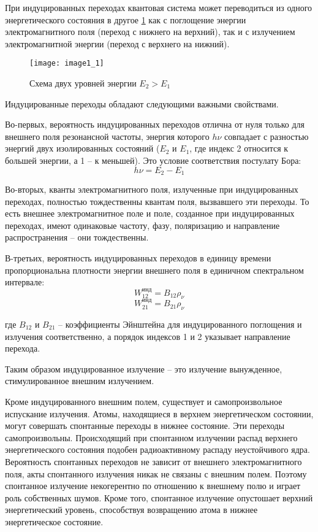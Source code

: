 
При индуцированных переходах квантовая система может переводиться из одного 
энергетического состояния в другое \ref{img1.1} как с поглощение энергии 
электромагнитного поля (переход с нижнего на верхний), так и с излучением 
электромагнитной энергии (переход с верхнего на нижний).

\begin{figure}[h!]
	\center
	\texttt{[image: image1\_1]} \\
	\caption{Схема двух уровней энергии \( E_2 > E_1 \)}
	\label{img1.1}
\end{figure}

Индуцированные переходы обладают следующими важными свойствами.

Во-первых, вероятность индуцированных переходов отлична от нуля только для 
внешнего поля резонансной частоты, энергия которого \( h\nu \) совпадает с 
разностью энергий двух изолированных состояний (\( E_2 \) и \( E_1 \), где 
индекс 2 относится к большей энергии, а 1 -- к меньшей). Это условие 
соответствия постулату Бора:
\[
	h\nu = E_2 - E_1
\]

Во-вторых, кванты электромагнитного поля, излученные при индуцированных 
переходах, полностью тождественны квантам поля, вызвавшего эти переходы. 
То есть внешнее электромагнитное поле и поле, созданное при индуцированных 
переходах, имеют одинаковые частоту, фазу, поляризацию и направление 
распространения -- они тождественны.

В-третьих, вероятность индуцированных переходов в единицу времени 
пропорциональна плотности энергии внешнего поля в единичном спектральном 
интервале:
\begin{equation}
	W_{12}^\text{инд} = B_{12}\rho_\nu
	\label{eq3.1.2}
\end{equation}
\begin{equation}
	W_{21}^\text{инд} = B_{21}\rho_\nu
	\label{eq3.1.3}
\end{equation}

где \( B_{12} \) и  \( B_{21} \) -- коэффициенты Эйнштейна для индуцированного 
поглощения и излучения соответственно, а порядок индексов 1 и 2 указывает 
направление перехода.

Таким образом индуцированное излучение -- это излучение вынужденное, 
стимулированное внешним излучением. 

Кроме индуцированного внешним полем, существует и самопроизвольное испускание 
излучения. Атомы, находящиеся в верхнем энергетическом состоянии, могут 
совершать спонтанные переходы в нижнее состояние. Эти переходы 
самопроизвольны. Происходящий при спонтанном излучении распад верхнего 
энергетического состояния подобен радиоактивному распаду неустойчивого ядра. 
Вероятность спонтанных переходов не зависит от внешнего электромагнитного 
поля, акты спонтанного излучения никак не связаны с внешним полем. Поэтому 
спонтанное излучение некогерентно по отношению к внешнему полю и играет 
роль собственных шумов. Кроме того, спонтанное излучение опустошает верхний 
энергетический уровень, способствуя возвращению атома в нижнее энергетическое 
состояние.

